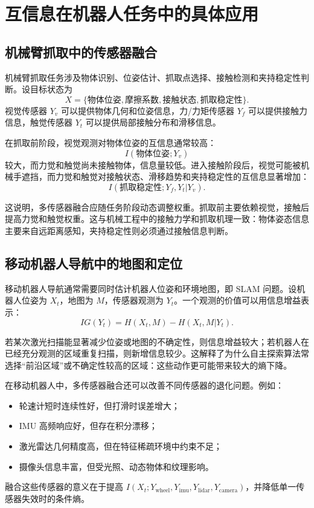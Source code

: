 \documentclass[UTF8,a4paper,12pt]{ctexart}
\begin{document}
\section{互信息在机器人任务中的具体应用}

\subsection{机械臂抓取中的传感器融合}

机械臂抓取任务涉及物体识别、位姿估计、抓取点选择、接触检测和夹持稳定性判断。设目标状态为
\[
X=\{\text{物体位姿},\text{摩擦系数},\text{接触状态},\text{抓取稳定性}\}.
\]
视觉传感器 $Y_v$ 可以提供物体几何和位姿信息，力/力矩传感器 $Y_f$ 可以提供接触力信息，触觉传感器 $Y_t$ 可以提供局部接触分布和滑移信息。

在抓取前阶段，视觉观测对物体位姿的互信息通常较高：
\begin{equation}
I(\text{物体位姿};Y_v)
\end{equation}
较大，而力觉和触觉尚未接触物体，信息量较低。进入接触阶段后，视觉可能被机械手遮挡，而力觉和触觉对接触状态、滑移趋势和夹持稳定性的互信息显著增加：
\begin{equation}
I(\text{抓取稳定性};Y_f,Y_t|Y_v).
\end{equation}

这说明，多传感器融合应随任务阶段动态调整权重。抓取前主要依赖视觉，接触后提高力觉和触觉权重。这与机械工程中的接触力学和抓取机理一致：物体姿态信息主要来自远距离感知，夹持稳定性则必须通过接触信息判断。

\subsection{移动机器人导航中的地图和定位}

移动机器人导航通常需要同时估计机器人位姿和环境地图，即 SLAM 问题。设机器人位姿为 $X_t$，地图为 $M$，传感器观测为 $Y_t$。一个观测的价值可以用信息增益表示：
\begin{equation}
IG(Y_t)=H(X_t,M)-H(X_t,M|Y_t).
\end{equation}

若某次激光扫描能显著减少位姿或地图的不确定性，则信息增益较大；若机器人在已经充分观测的区域重复扫描，则新增信息较少。这解释了为什么自主探索算法常选择“前沿区域”或不确定性较高的区域：这些动作更可能带来较大的熵下降。

在移动机器人中，多传感器融合还可以改善不同传感器的退化问题。例如：
\begin{itemize}
  \item 轮速计短时连续性好，但打滑时误差增大；
  \item IMU 高频响应好，但存在积分漂移；
  \item 激光雷达几何精度高，但在特征稀疏环境中约束不足；
  \item 摄像头信息丰富，但受光照、动态物体和纹理影响。
\end{itemize}
融合这些传感器的意义在于提高 $I(X_t;Y_{\text{wheel}},Y_{\text{imu}},Y_{\text{lidar}},Y_{\text{camera}})$，并降低单一传感器失效时的条件熵。
\end{document}
